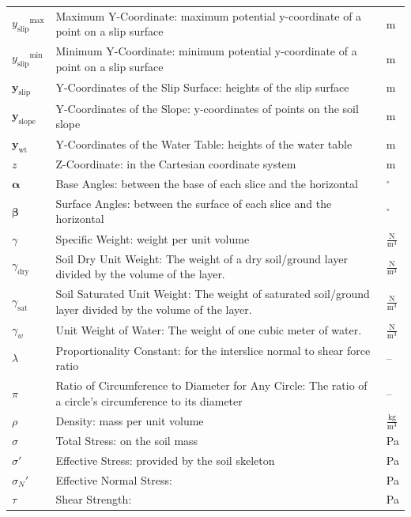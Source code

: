 \documentclass[12pt]{article}
\begin{document}
\begin{longtabu}{l X[l] l}
\\
${{y_{\text{slip}}}^{\text{max}}}$ & Maximum Y-Coordinate: maximum potential y-coordinate of a point on a slip surface & m
\\
${{y_{\text{slip}}}^{\text{min}}}$ & Minimum Y-Coordinate: minimum potential y-coordinate of a point on a slip surface & m
\\
${\mathbf{y}_{\text{slip}}}$ & Y-Coordinates of the Slip Surface: heights of the slip surface & m
\\
${\mathbf{y}_{\text{slope}}}$ & Y-Coordinates of the Slope: y-coordinates of points on the soil slope & m
\\
${\mathbf{y}_{\text{wt}}}$ & Y-Coordinates of the Water Table: heights of the water table & m
\\
$z$ & Z-Coordinate: in the Cartesian coordinate system & m
\\
$\mathbf{α}$ & Base Angles: between the base of each slice and the horizontal & ${}^{\circ}$
\\
$\mathbf{β}$ & Surface Angles: between the surface of each slice and the horizontal & ${}^{\circ}$
\\
$γ$ & Specific Weight: weight per unit volume & $\frac{\text{N}}{\text{m}^{3}}$
\\
${γ_{\text{dry}}}$ & Soil Dry Unit Weight: The weight of a dry soil/ground layer divided by the volume of the layer. & $\frac{\text{N}}{\text{m}^{3}}$
\\
${γ_{\text{sat}}}$ & Soil Saturated Unit Weight: The weight of saturated soil/ground layer divided by the volume of the layer. & $\frac{\text{N}}{\text{m}^{3}}$
\\
${γ_{w}}$ & Unit Weight of Water: The weight of one cubic meter of water. & $\frac{\text{N}}{\text{m}^{3}}$
\\
$λ$ & Proportionality Constant: for the interslice normal to shear force ratio & --
\\
$π$ & Ratio of Circumference to Diameter for Any Circle: The ratio of a circle's circumference to its diameter & --
\\
$ρ$ & Density: mass per unit volume & $\frac{\text{kg}}{\text{m}^{3}}$
\\
$σ$ & Total Stress: on the soil mass & Pa
\\
$σ'$ & Effective Stress: provided by the soil skeleton & Pa
\\
${σ_{N}}'$ & Effective Normal Stress:  & Pa
\\
$τ$ & Shear Strength:  & Pa
\\

\end{longtabu}
\end{document}
